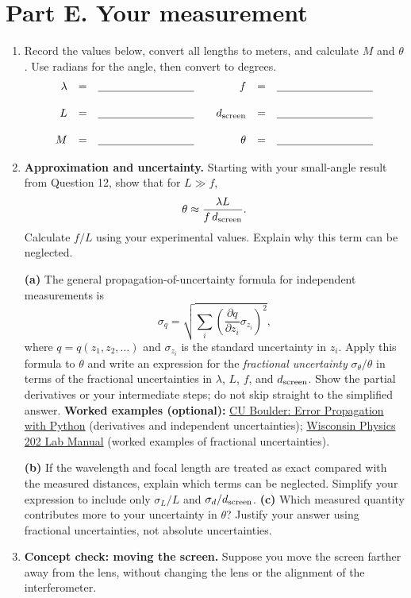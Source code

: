 \documentclass[11pt]{article}
\newcommand{\answerspace}[1]{\vspace{#1}}
\begin{document}
\section*{Part E. Your measurement}
\begin{enumerate}[resume]
\item Record the values below, convert all lengths to meters, and calculate $M$ and $\theta$. Use radians for the angle, then convert to degrees.
\[\begin{array}{rcl@{\qquad}rcl}
\lambda&=&\underline{\hspace{1.2in}}&f&=&\underline{\hspace{1.2in}}\\[12pt]
L&=&\underline{\hspace{1.2in}}&d_{\rm screen}&=&\underline{\hspace{1.2in}}\\[12pt]
M&=&\underline{\hspace{1.2in}}&\theta&=&\underline{\hspace{1.2in}}
\end{array}\]
\answerspace{0.6in}
\newpage
\item \textbf{Approximation and uncertainty.} Starting with your small-angle result from Question 12, show that for $L\gg f$,
\[\theta\approx\frac{\lambda L}{f\,d_{\rm screen}}.\]
Calculate $f/L$ using your experimental values. Explain why this term can be neglected.
\answerspace{0.45in}

\textbf{(a)} The general propagation-of-uncertainty formula for independent measurements is
\[\sigma_q=\sqrt{\sum_i\left(\frac{\partial q}{\partial z_i}\sigma_{z_i}\right)^2},\]
where $q=q(z_1,z_2,\ldots)$ and $\sigma_{z_i}$ is the standard uncertainty in $z_i$.
Apply this formula to $\theta$ and write an expression for the \emph{fractional uncertainty} $\sigma_\theta/\theta$ in terms of the fractional uncertainties in $\lambda$, $L$, $f$, and $d_{\rm screen}$. Show the partial derivatives or your intermediate steps; do not skip straight to the simplified answer.
\smallskip
\noindent\textbf{Worked examples (optional):} \href{https://physicslabs.colorado.edu/courses/python/data-analysis/error-propagation}{CU Boulder: Error Propagation with Python} (derivatives and independent uncertainties); \href{https://www.physics.wisc.edu/instructional/LabManuals/Archive/UWPhysics202Fall22LabManual.pdf}{Wisconsin Physics 202 Lab Manual} (worked examples of fractional uncertainties).
\par\smallskip
\textbf{(b)} If the wavelength and focal length are treated as exact compared with the measured distances, explain which terms can be neglected. Simplify your expression to include only $\sigma_L/L$ and $\sigma_d/d_{\rm screen}$.
\textbf{(c)} Which measured quantity contributes more to your uncertainty in $\theta$? Justify your answer using fractional uncertainties, not absolute uncertainties.
\smallskip
\answerspace{1.45in}
\item \textbf{Concept check: moving the screen.} Suppose you move the screen farther away from the lens, without changing the lens or the alignment of the interferometer.


\end{enumerate}
\end{document}
